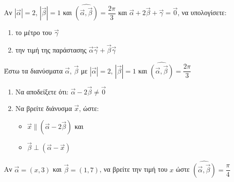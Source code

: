 \documentclass{presentation}
\begin{document}
\begin{askisi}
  Αν $|\vec{α}|=2$, $|\vec{β}|=1$ και $\widehat{(\vec{α }, \vec{β })}=\dfrac{2\pi}{3}$ και $\vec{α}+2\vec{β}+\vec{γ}=\vec{0}$, να υπολογίσετε:
  \begin{enumerate}
    \item<1-> το μέτρο του $\vec{γ}$
    \item<2-> την τιμή της παράστασης $\vec{α}\vec{γ}+\vec{β}\vec{γ}$
  \end{enumerate}

\end{askisi}



\begin{askisi}
  Έστω τα διανύσματα $\vec{α}$, $\vec{β}$ με $|\vec{α}|=2$, $|\vec{β}|=1$ και $\widehat{(\vec{α }, \vec{β })}=\dfrac{2\pi}{3}$
  \begin{enumerate}
    \item<1-> Να αποδείξετε ότι: $\vec{α}-2\vec{β}\ne \vec{0}$
    \item<2-> Να βρείτε διάνυσμα $\vec{x}$, ώστε:
          \begin{itemize}
            \item $\vec{x}\parallel (\vec{α}-2\vec{β})$ και
            \item $\vec{β}\perp (\vec{α}-\vec{x})$
          \end{itemize}
  \end{enumerate}

\end{askisi}

\begin{askisi}
  Αν $\vec{α}=(x,3)$ και $\vec{β}=(1,7)$, να βρείτε την τιμή του $x$ ώστε $\widehat{(\vec{α }, \vec{β })}=\dfrac{\pi}{4}$

\end{askisi}
\end{document}

